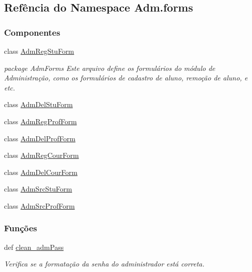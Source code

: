 \hypertarget{namespaceAdm_1_1forms}{\subsection{Refência do Namespace Adm.\-forms}
\label{namespaceAdm_1_1forms}
}
\subsubsection*{Componentes}
\begin{DoxyCompactItemize}
\item 
class \hyperlink{classAdm_1_1forms_1_1AdmRegStuForm}{Adm\-Reg\-Stu\-Form}
\begin{DoxyCompactList}\small\item\em package Adm\-Forms Este arquivo define os formulários do módulo de Administração, como os formulários de cadastro de aluno, remoção de aluno, e etc. \end{DoxyCompactList}\item 
class \hyperlink{classAdm_1_1forms_1_1AdmDelStuForm}{Adm\-Del\-Stu\-Form}
\item 
class \hyperlink{classAdm_1_1forms_1_1AdmRegProfForm}{Adm\-Reg\-Prof\-Form}
\item 
class \hyperlink{classAdm_1_1forms_1_1AdmDelProfForm}{Adm\-Del\-Prof\-Form}
\item 
class \hyperlink{classAdm_1_1forms_1_1AdmRegCourForm}{Adm\-Reg\-Cour\-Form}
\item 
class \hyperlink{classAdm_1_1forms_1_1AdmDelCourForm}{Adm\-Del\-Cour\-Form}
\item 
class \hyperlink{classAdm_1_1forms_1_1AdmSrcStuForm}{Adm\-Src\-Stu\-Form}
\item 
class \hyperlink{classAdm_1_1forms_1_1AdmSrcProfForm}{Adm\-Src\-Prof\-Form}
\end{DoxyCompactItemize}
\subsubsection*{Funções}
\begin{DoxyCompactItemize}
\item 
def \hyperlink{namespaceAdm_1_1forms_a24e20fddb6abcb82f01bad3bccb4d44e}{clean\-\_\-adm\-Pass}
\begin{DoxyCompactList}\small\item\em Verifica se a formatação da senha do administrador está correta. \end{DoxyCompactList}\end{DoxyCompactItemize}


